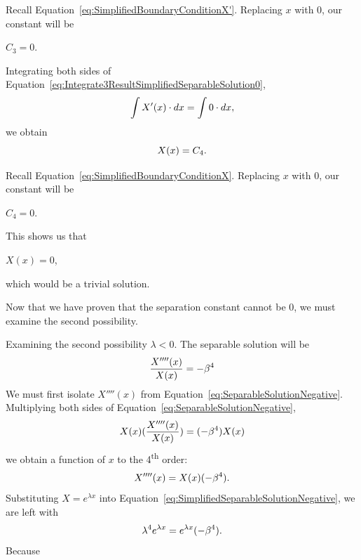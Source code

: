 \documentclass[12pt]{article}
\begin{document}
Recall Equation~\eqref{eq:SimplifiedBoundaryConditionX'}. Replacing $x$ with $0$, our constant will be \\

\centerline{$C_3=0$.}

Integrating both sides of Equation~\eqref{eq:Integrate3ResultSimplifiedSeparableSolution0},
\begin{equation}\label{eq:Integrate4SimplifiedSeparableSolution0}
    \centering
    \int X'(x)\cdot dx = \int0\cdot dx,
\end{equation}
we obtain
\begin{equation}\label{eq:Integrate4ResultSimplifiedSeparableSolution0}
    \centering
    X(x) = C_{4}.
\end{equation}

Recall Equation~\eqref{eq:SimplifiedBoundaryConditionX}. Replacing $x$ with $0$, our constant will be \\

\centerline{$C_4=0$.}

This shows us that

\centerline{$X(x)=0$,}

which would be a trivial solution.

Now that we have proven that the separation constant cannot be 0, we must examine the second possibility.

Examining the second possibility $\lambda<0$. The separable solution will be
\begin{equation}\label{eq:SeparableSolutionNegative}
    \centering
    \frac{X''''(x)}{X(x)} = -\beta^4
\end{equation}
We must first isolate $X''''(x)$ from Equation~\eqref{eq:SeparableSolutionNegative}. Multiplying both sides of Equation~\eqref{eq:SeparableSolutionNegative}, 
\begin{equation}\label{eq:SeparableSolutionNegativeCancelX}
    \centering
    X(x)(\frac{X''''(x)}{X(x)}) = (-\beta^4)X(x)
\end{equation}
we obtain a function of $x$ to the 4\textsuperscript{th} order:
\begin{equation}\label{eq:SimplifiedSeparableSolutionNegative}
    \centering
    X''''(x) = X(x)(-\beta^4).
\end{equation}
Substituting $X=e^{\lambda x}$ into Equation~\eqref{eq:SimplifiedSeparableSolutionNegative}, we are left with
\begin{equation}\label{eq:LambdaSeparableSolutionNegative}
    \centering
    \lambda^4e^{\lambda x} = e^{\lambda x}(-\beta^4).
\end{equation}
Because 
\end{document}
